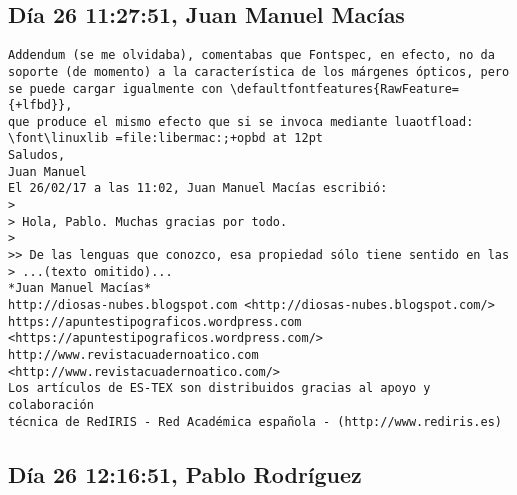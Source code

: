 \documentclass[a4paper,10pt]{article}
\begin{document}
\subsection{Día 26 11:27:51, Juan Manuel Macías}

\begin{lstlisting}
Addendum (se me olvidaba), comentabas que Fontspec, en efecto, no da 
soporte (de momento) a la característica de los márgenes ópticos, pero 
se puede cargar igualmente con \defaultfontfeatures{RawFeature={+lfbd}}, 
que produce el mismo efecto que si se invoca mediante luaotfload: 
\font\linuxlib =file:libermac:;+opbd at 12pt
Saludos,
Juan Manuel
El 26/02/17 a las 11:02, Juan Manuel Macías escribió:
>
> Hola, Pablo. Muchas gracias por todo.
>
>> De las lenguas que conozco, esa propiedad sólo tiene sentido en las
> ...(texto omitido)...
*Juan Manuel Macías*
http://diosas-nubes.blogspot.com <http://diosas-nubes.blogspot.com/>
https://apuntestipograficos.wordpress.com 
<https://apuntestipograficos.wordpress.com/>
http://www.revistacuadernoatico.com <http://www.revistacuadernoatico.com/>
Los artículos de ES-TEX son distribuidos gracias al apoyo y colaboración 
técnica de RedIRIS - Red Académica española - (http://www.rediris.es)

\end{lstlisting}

\subsection{Día 26 12:16:51, Pablo Rodríguez}
\end{document}
